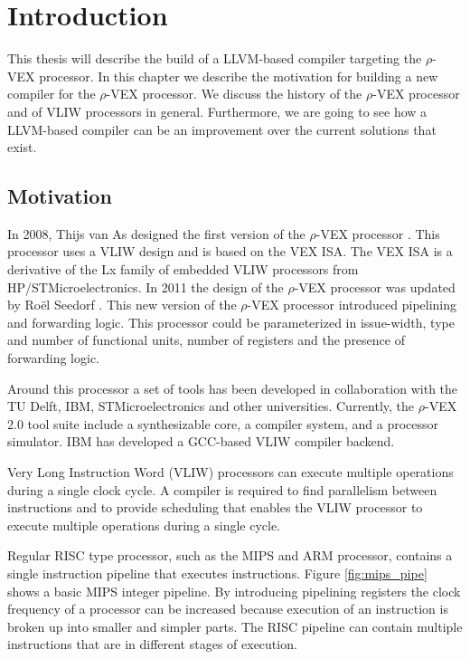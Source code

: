 \chapter{Introduction}
\label{chap:introduction}
This thesis will describe the build of a LLVM-based compiler targeting the $\rho$-VEX processor. In this chapter we describe the motivation for building a new compiler for the $\rho$-VEX processor. We discuss the history of the $\rho$-VEX processor and of VLIW processors in general. Furthermore, we are going to see how a LLVM-based compiler can be an improvement over the current solutions that exist.

\section{Motivation}
In 2008, Thijs van As designed the first version of the $\rho$-VEX processor \cite{As:2008rt}. This processor uses a VLIW design and is based on the VEX ISA. The VEX ISA is a derivative of the Lx family of embedded VLIW processors \cite{854391} from HP/STMicroelectronics. In 2011 the design of the $\rho$-VEX  processor was updated by Ro\"{e}l Seedorf \cite{Roel-Seedorf:2012qf}. This new version of the $\rho$-VEX  processor introduced pipelining and forwarding logic. This processor could be parameterized in issue-width, type and number of functional units, number of registers and the presence of forwarding logic.

Around this processor a set of tools has been developed in collaboration with the TU Delft, IBM, STMicroelectronics and other universities. Currently, the $\rho$-VEX 2.0 tool suite include a synthesizable core, a compiler system, and a processor simulator. IBM has developed a GCC-based VLIW compiler backend.

Very Long Instruction Word (VLIW) processors can execute multiple operations during a single clock cycle. A compiler is required to find parallelism between instructions and to provide scheduling that enables the VLIW processor to execute multiple operations during a single cycle.

Regular RISC type processor, such as the MIPS and ARM processor, contains a single instruction pipeline that executes instructions. Figure \ref{fig:mips_pipe} shows a basic MIPS integer pipeline. By introducing pipelining registers the clock frequency of a processor can be increased because execution of an instruction is broken up into smaller and simpler parts. The RISC pipeline can contain multiple instructions that are in different stages of execution.

